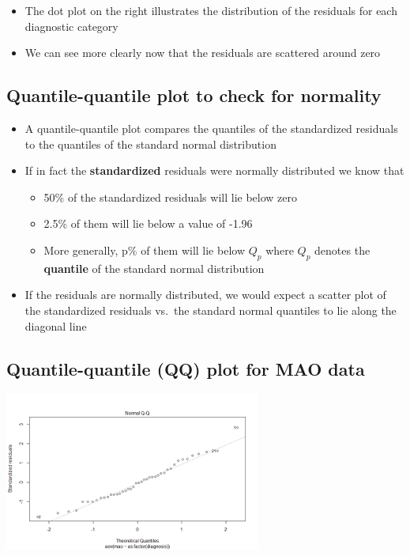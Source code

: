 \documentclass[
]{book}
\providecommand{\tightlist}{%
  \setlength{\itemsep}{0pt}\setlength{\parskip}{0pt}}
\begin{document}
\begin{itemize}
\tightlist
\item
  The dot plot on the right illustrates the distribution of the residuals for each diagnostic category
\item
  We can see more clearly now that the residuals are scattered around zero
\end{itemize}

\hypertarget{quantile-quantile-plot-to-check-for-normality}{%
\subsection{Quantile-quantile plot to check for normality}\label{quantile-quantile-plot-to-check-for-normality}}

\begin{itemize}
\tightlist
\item
  A quantile-quantile plot compares the quantiles of the standardized residuals to the quantiles of the standard normal distribution
\item
  If in fact the \textbf{standardized} residuals were normally distributed we know that

  \begin{itemize}
  \tightlist
  \item
    50\% of the standardized residuals will lie below zero
  \item
    2.5\% of them will lie below a value of -1.96
  \item
    More generally, p\% of them will lie below \(Q_p\) where \(Q_p\) denotes the \textbf{quantile} of the standard normal distribution
  \end{itemize}
\item
  If the residuals are normally distributed, we would expect a scatter plot of the standardized residuals vs.~the standard normal quantiles to lie along the diagonal line
\end{itemize}

\hypertarget{quantile-quantile-qq-plot-for-mao-data}{%
\subsection{Quantile-quantile (QQ) plot for MAO data}\label{quantile-quantile-qq-plot-for-mao-data}}

\includegraphics[width=0.5\linewidth]{./10_43}
\end{document}
